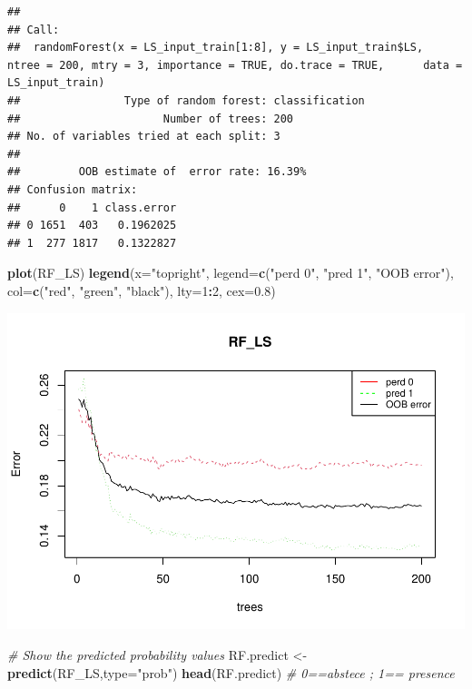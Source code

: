 \documentclass[
]{book}
\newenvironment{Shaded}{\begin{snugshade}}{\end{snugshade}}
\newcommand{\AttributeTok}[1]{\textcolor[rgb]{0.13,0.29,0.53}{#1}}
\newcommand{\CommentTok}[1]{\textcolor[rgb]{0.56,0.35,0.01}{\textit{#1}}}
\newcommand{\DecValTok}[1]{\textcolor[rgb]{0.00,0.00,0.81}{#1}}
\newcommand{\FloatTok}[1]{\textcolor[rgb]{0.00,0.00,0.81}{#1}}
\newcommand{\FunctionTok}[1]{\textcolor[rgb]{0.13,0.29,0.53}{\textbf{#1}}}
\newcommand{\NormalTok}[1]{#1}
\newcommand{\OtherTok}[1]{\textcolor[rgb]{0.56,0.35,0.01}{#1}}
\newcommand{\SpecialCharTok}[1]{\textcolor[rgb]{0.81,0.36,0.00}{\textbf{#1}}}
\newcommand{\StringTok}[1]{\textcolor[rgb]{0.31,0.60,0.02}{#1}}
\begin{document}
\begin{verbatim}
## 
## Call:
##  randomForest(x = LS_input_train[1:8], y = LS_input_train$LS,      ntree = 200, mtry = 3, importance = TRUE, do.trace = TRUE,      data = LS_input_train) 
##                Type of random forest: classification
##                      Number of trees: 200
## No. of variables tried at each split: 3
## 
##         OOB estimate of  error rate: 16.39%
## Confusion matrix:
##      0    1 class.error
## 0 1651  403   0.1962025
## 1  277 1817   0.1322827
\end{verbatim}

\begin{Shaded}
\begin{Highlighting}[]
\FunctionTok{plot}\NormalTok{(RF\_LS)}
\FunctionTok{legend}\NormalTok{(}\AttributeTok{x=}\StringTok{"topright"}\NormalTok{, }\AttributeTok{legend=}\FunctionTok{c}\NormalTok{(}\StringTok{"perd 0"}\NormalTok{, }\StringTok{"pred 1"}\NormalTok{, }\StringTok{"OOB error"}\NormalTok{), }
 \AttributeTok{col=}\FunctionTok{c}\NormalTok{(}\StringTok{"red"}\NormalTok{, }\StringTok{"green"}\NormalTok{, }\StringTok{"black"}\NormalTok{), }\AttributeTok{lty=}\DecValTok{1}\SpecialCharTok{:}\DecValTok{2}\NormalTok{, }\AttributeTok{cex=}\FloatTok{0.8}\NormalTok{)}
\end{Highlighting}
\end{Shaded}

\includegraphics{06-RF_files/figure-latex/RF-outputs-1.pdf}

\begin{Shaded}
\begin{Highlighting}[]
\CommentTok{\# Show the predicted probability values}
\NormalTok{RF.predict }\OtherTok{\textless{}{-}} \FunctionTok{predict}\NormalTok{(RF\_LS,}\AttributeTok{type=}\StringTok{"prob"}\NormalTok{)}
\FunctionTok{head}\NormalTok{(RF.predict) }\CommentTok{\# 0==abstece ; 1== presence}
\end{Highlighting}
\end{Shaded}
\end{document}
